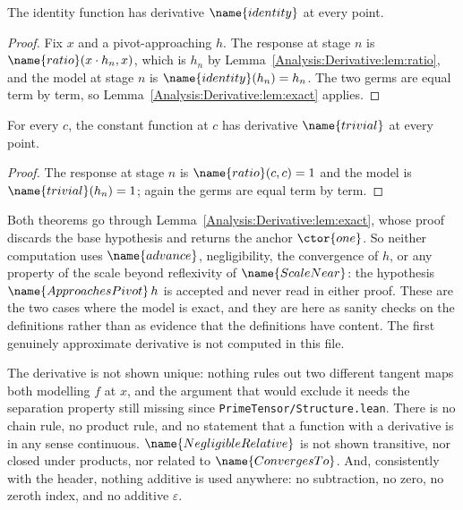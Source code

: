 \begin{theorem}
\label{Analysis:Derivative:thm:identity}
The identity function has derivative $\name{identity}$ at every point.
\end{theorem}

\begin{proof}
Fix $x$ and a pivot-approaching $h$.  The response at stage $n$ is
$\name{ratio}(x \cdot h_n, x)$, which is $h_n$ by
Lemma~\ref{Analysis:Derivative:lem:ratio}, and the model at stage $n$ is
$\name{identity}(h_n) = h_n$.  The two germs are equal term by term, so
Lemma~\ref{Analysis:Derivative:lem:exact} applies.
\end{proof}

\begin{theorem}
\label{Analysis:Derivative:thm:constant}
For every $c$, the constant function at $c$ has derivative $\name{trivial}$ at
every point.
\end{theorem}

\begin{proof}
The response at stage $n$ is $\name{ratio}(c,c) = 1$ and the model is
$\name{trivial}(h_n) = 1$; again the germs are equal term by term.
\end{proof}

\begin{remark}
\label{Analysis:Derivative:rem:exact-only}
Both theorems go through Lemma~\ref{Analysis:Derivative:lem:exact}, whose proof
discards the base hypothesis and returns the anchor $\ctor{one}$.  So neither
computation uses $\name{advance}$, negligibility, the convergence of $h$, or
any property of the scale beyond reflexivity of $\name{ScaleNear}$: the
hypothesis $\name{ApproachesPivot}\,h$ is accepted and never read in either
proof.  These are the two cases where the model is exact, and they are here as
sanity checks on the definitions rather than as evidence that the definitions
have content.  The first genuinely approximate derivative is not computed in
this file.
\end{remark}

\begin{remark}\label{Analysis:Derivative:rem:missing}
The derivative is not shown unique: nothing rules out two different tangent
maps both modelling $f$ at $x$, and the argument that would exclude it needs
the separation property still missing since
\texttt{PrimeTensor/Structure.lean}.  There is no chain rule, no product rule,
and no statement that a function with a derivative is in any sense continuous.
$\name{NegligibleRelative}$ is not shown transitive, nor closed under products,
nor related to $\name{ConvergesTo}$.  And, consistently with the header,
nothing additive is used anywhere: no subtraction, no zero, no zeroth index,
and no additive $\varepsilon$.
\end{remark}

